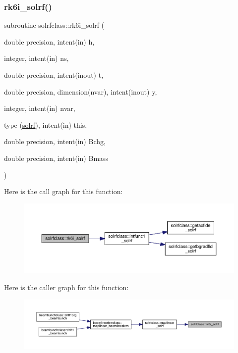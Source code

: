 \subsubsection{\texorpdfstring{rk6i\_solrf()}{rk6i\_solrf()}}
{\footnotesize\ttfamily subroutine solrfclass\+::rk6i\+\_\+solrf (\begin{DoxyParamCaption}\item[{double precision, intent(in)}]{h,  }\item[{integer, intent(in)}]{ns,  }\item[{double precision, intent(inout)}]{t,  }\item[{double precision, dimension(nvar), intent(inout)}]{y,  }\item[{integer, intent(in)}]{nvar,  }\item[{type (\mbox{\hyperlink{namespacesolrfclass_structsolrfclass_1_1solrf}{solrf}}), intent(in)}]{this,  }\item[{double precision, intent(in)}]{Bchg,  }\item[{double precision, intent(in)}]{Bmass }\end{DoxyParamCaption})}

Here is the call graph for this function\+:\nopagebreak
\begin{figure}[H]
\begin{center}
\leavevmode
\includegraphics[width=350pt]{namespacesolrfclass_a47bcede8ab38e0e035ef1be479490018_cgraph}
\end{center}
\end{figure}
Here is the caller graph for this function\+:\nopagebreak
\begin{figure}[H]
\begin{center}
\leavevmode
\includegraphics[width=350pt]{namespacesolrfclass_a47bcede8ab38e0e035ef1be479490018_icgraph}
\end{center}
\end{figure}
\mbox{\label{namespacesolrfclass_ad06b3becdb99ba947f714809bea2af35}} 
